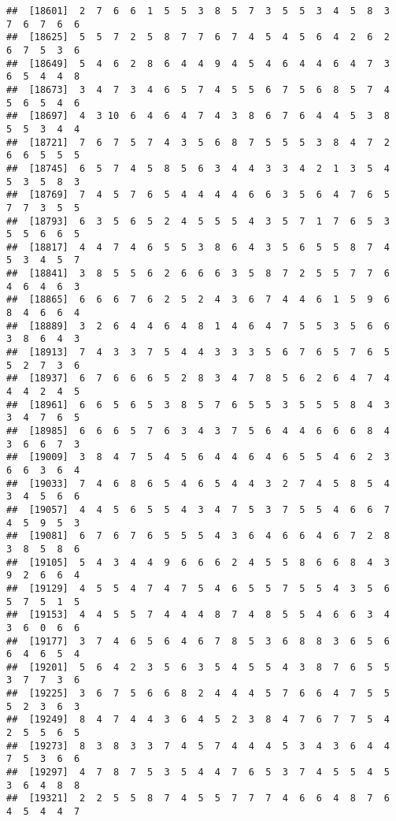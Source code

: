 \documentclass[
]{book}
\begin{document}
\begin{verbatim}
##  [18601]  2  7  6  6  1  5  5  3  8  5  7  3  5  5  3  4  5  8  3  7  6  7  6  6
##  [18625]  5  5  7  2  5  8  7  7  6  7  4  5  4  5  6  4  2  6  2  6  7  5  3  6
##  [18649]  5  4  6  2  8  6  4  4  9  4  5  4  6  4  4  6  4  7  3  6  5  4  4  8
##  [18673]  3  4  7  3  4  6  5  7  4  5  5  6  7  5  6  8  5  7  4  5  6  5  4  6
##  [18697]  4  3 10  6  4  6  4  7  4  3  8  6  7  6  4  4  5  3  8  5  5  3  4  4
##  [18721]  7  6  7  5  7  4  3  5  6  8  7  5  5  5  3  8  4  7  2  6  6  5  5  5
##  [18745]  6  5  7  4  5  8  5  6  3  4  4  3  3  4  2  1  3  5  4  5  3  5  8  3
##  [18769]  7  4  5  7  6  5  4  4  4  4  6  6  3  5  6  4  7  6  5  7  7  3  5  5
##  [18793]  6  3  5  6  5  2  4  5  5  5  4  3  5  7  1  7  6  5  3  5  5  6  6  5
##  [18817]  4  4  7  4  6  5  5  3  8  6  4  3  5  6  5  5  8  7  4  5  3  4  5  7
##  [18841]  3  8  5  5  6  2  6  6  6  3  5  8  7  2  5  5  7  7  6  4  6  4  6  3
##  [18865]  6  6  6  7  6  2  5  2  4  3  6  7  4  4  6  1  5  9  6  8  4  6  6  4
##  [18889]  3  2  6  4  4  6  4  8  1  4  6  4  7  5  5  3  5  6  6  3  8  6  4  3
##  [18913]  7  4  3  3  7  5  4  4  3  3  3  5  6  7  6  5  7  6  5  5  2  7  3  6
##  [18937]  6  7  6  6  6  5  2  8  3  4  7  8  5  6  2  6  4  7  4  4  4  2  4  5
##  [18961]  6  6  5  6  5  3  8  5  7  6  5  5  3  5  5  5  8  4  3  3  4  7  6  5
##  [18985]  6  6  6  5  7  6  3  4  3  7  5  6  4  4  6  6  6  8  4  3  6  6  7  3
##  [19009]  3  8  4  7  5  4  5  6  4  4  6  4  6  5  5  4  6  2  3  6  6  3  6  4
##  [19033]  7  4  6  8  6  5  4  6  5  4  4  3  2  7  4  5  8  5  4  3  4  5  6  6
##  [19057]  4  4  5  6  5  5  4  3  4  7  5  3  7  5  5  4  6  6  7  4  5  9  5  3
##  [19081]  6  7  6  7  6  5  5  5  4  3  6  4  6  6  4  6  7  2  8  3  8  5  8  6
##  [19105]  5  4  3  4  4  9  6  6  6  2  4  5  5  8  6  6  8  4  3  9  2  6  6  4
##  [19129]  4  5  5  4  7  4  7  5  4  6  5  5  7  5  5  4  3  5  6  5  7  5  1  5
##  [19153]  4  4  5  5  7  4  4  4  8  7  4  8  5  5  4  6  6  3  4  3  6  0  6  6
##  [19177]  3  7  4  6  5  6  4  6  7  8  5  3  6  8  8  3  6  5  6  6  4  6  5  4
##  [19201]  5  6  4  2  3  5  6  3  5  4  5  5  4  3  8  7  6  5  5  3  7  7  3  6
##  [19225]  3  6  7  5  6  6  8  2  4  4  4  5  7  6  6  4  7  5  5  5  2  3  6  3
##  [19249]  8  4  7  4  4  3  6  4  5  2  3  8  4  7  6  7  7  5  4  2  5  5  6  5
##  [19273]  8  3  8  3  3  7  4  5  7  4  4  4  5  3  4  3  6  4  4  7  5  3  6  6
##  [19297]  4  7  8  7  5  3  5  4  4  7  6  5  3  7  4  5  5  4  5  3  6  4  8  8
##  [19321]  2  2  5  5  8  7  4  5  5  7  7  7  4  6  6  4  8  7  6  4  5  4  4  7

\end{verbatim}
\end{document}
